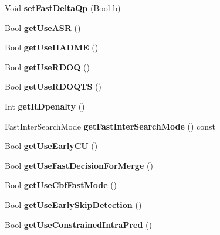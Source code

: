 \begin{DoxyCompactItemize}
Void {\bfseries set\+Fast\+Delta\+Qp} (Bool b)
\item 
\mbox{\label{class_t_enc_cfg_a30b2e3478171b48eae84d002b00b599d}} 
Bool {\bfseries get\+Use\+A\+SR} ()
\item 
\mbox{\label{class_t_enc_cfg_a02e9da7fc716ae787886c99aca91a037}} 
Bool {\bfseries get\+Use\+H\+A\+D\+ME} ()
\item 
\mbox{\label{class_t_enc_cfg_adc9f62247faff1f2993483cb691b8fdc}} 
Bool {\bfseries get\+Use\+R\+D\+OQ} ()
\item 
\mbox{\label{class_t_enc_cfg_a4d25b44b889bf0fcd93e84107c69b77a}} 
Bool {\bfseries get\+Use\+R\+D\+O\+Q\+TS} ()
\item 
\mbox{\label{class_t_enc_cfg_abdc5dafe71cc63b97dd9e396dc198a85}} 
Int {\bfseries get\+R\+Dpenalty} ()
\item 
\mbox{\label{class_t_enc_cfg_a2029a14ee6c19ce279253a968d899434}} 
Fast\+Inter\+Search\+Mode {\bfseries get\+Fast\+Inter\+Search\+Mode} () const
\item 
\mbox{\label{class_t_enc_cfg_a59d7ba9a05f194271a54170212f2ba94}} 
Bool {\bfseries get\+Use\+Early\+CU} ()
\item 
\mbox{\label{class_t_enc_cfg_aeeefd215ee1518afead08c8c271333c2}} 
Bool {\bfseries get\+Use\+Fast\+Decision\+For\+Merge} ()
\item 
\mbox{\label{class_t_enc_cfg_a04188d125221201b44f61e9278911dc2}} 
Bool {\bfseries get\+Use\+Cbf\+Fast\+Mode} ()
\item 
\mbox{\label{class_t_enc_cfg_ac5ef793b16e2b8bf24795fdd00cf0e34}} 
Bool {\bfseries get\+Use\+Early\+Skip\+Detection} ()
\item 
\mbox{\label{class_t_enc_cfg_a8519d3115896facc4e3ff94b9e7634c5}} 
Bool {\bfseries get\+Use\+Constrained\+Intra\+Pred} ()
\item 
\mbox{\label{class_t_enc_cfg_a355d05bde64b11f2ac677b6bcc0a97aa}} 

\end{DoxyCompactItemize}
